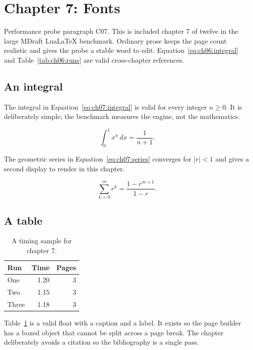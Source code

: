 \section{Chapter 7: Fonts}
\label{sec:ch07}

Performance probe paragraph C07. This is included chapter 7 of twelve in
the large MDraft LuaLaTeX benchmark. Ordinary prose keeps the page count
realistic and gives the probe a stable word to edit. Equation~\ref{eq:ch06:integral} and
Table~\ref{tab:ch06:runs} are valid cross-chapter references.

\subsection{An integral}
The integral in Equation~\ref{eq:ch07:integral} is valid for every integer
$n \ge 0$. It is deliberately simple; the benchmark measures the engine, not
the mathematics.

\begin{equation}
  \label{eq:ch07:integral}
  \int_{0}^{1} x^{n}\,dx = \frac{1}{n+1}.
\end{equation}

The geometric series in Equation~\ref{eq:ch07:series} converges for
$|r| < 1$ and gives a second display to render in this chapter.

\begin{equation}
  \label{eq:ch07:series}
  \sum_{k=0}^{m} r^{k} = \frac{1-r^{m+1}}{1-r}.
\end{equation}

\subsection{A table}
\begin{table}[h]
  \centering
  \begin{tabular}{lrr}
    \toprule
    Run & Time & Pages \\
    \midrule
    One   & 1.20 & 3 \\
    Two   & 1.15 & 3 \\
    Three & 1.18 & 3 \\
    \bottomrule
  \end{tabular}
  \caption{A timing sample for chapter 7.}
  \label{tab:ch07:runs}
\end{table}

Table~\ref{tab:ch07:runs} is a valid float with a caption and a label. It
exists so the page builder has a boxed object that cannot be split across a
page break. The chapter deliberately avoids a citation so the bibliography is a single pass.

